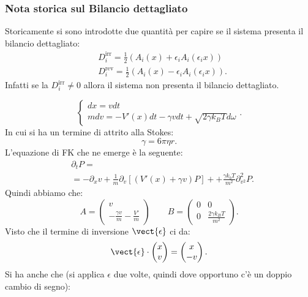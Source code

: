 \subsubsection{Nota storica sul Bilancio dettagliato}%
\label{subsub:Nota storica sul Bilancio dettagliato}
Storicamente si sono introdotte due quantità per capire se il sistema presenta il bilancio dettagliato:
\[\begin{aligned}
    & D^{\text{irr}}_i = \frac{1}{2}\left(A_i(x) + \epsilon_i A_i(\epsilon_ix)\right)\\
    & D^{\text{rev}}_i = \frac{1}{2}\left(A_i(x) - \epsilon_iA_i(\epsilon_ix) \right)
.\end{aligned}\]
Infatti se la $D^{\text{irr}}_i\neq 0$ allora il sistema non presenta il bilancio dettagliato.

\begin{exmp}[]
    \[
        \begin{cases}
            dx = vdt\\
	    mdv = -V'(x) dt - \gamma v dt + \sqrt{2\gamma  k_B T} d\omega
        \end{cases}
    .\] 
    In cui si ha un termine di attrito alla Stokes:
    \[
        \gamma = 6\pi  \eta r
    .\] 
   L'equazione di FK che ne emerge è la seguente:
   \[\begin{aligned}
       &\partial_{t}P =\\
       &=-\partial_{x}v + \frac{1}{m}\partial_{v}\left[\left(V'(x) + \gamma v\right)P\right] + 
		      +\frac{\gamma k_b T}{m^2}\partial^2_{v^2}P
   .\end{aligned}\]
   Quindi abbiamo che:
   \[
       A = \begin{pmatrix} v \\ - \frac{\gamma  v}{m} - \frac{V'}{m}\end{pmatrix} 
       \qquad 
       B = \begin{pmatrix} 
	   0 & 0 \\
	   0 & \frac{2\gamma k_BT}{m^2}
           \end{pmatrix} 
   .\] 
   Visto che il termine di inversione $\vect{\epsilon}$ ci da:
   \[
       \vect{\epsilon}\cdot \begin{pmatrix} x \\ v \end{pmatrix} = \begin{pmatrix} x \\ -v \end{pmatrix} 
   .\] 
   Si ha anche che (si applica $\epsilon$ due volte, quindi dove opportuno c'è un doppio cambio di segno):

\end{exmp}

